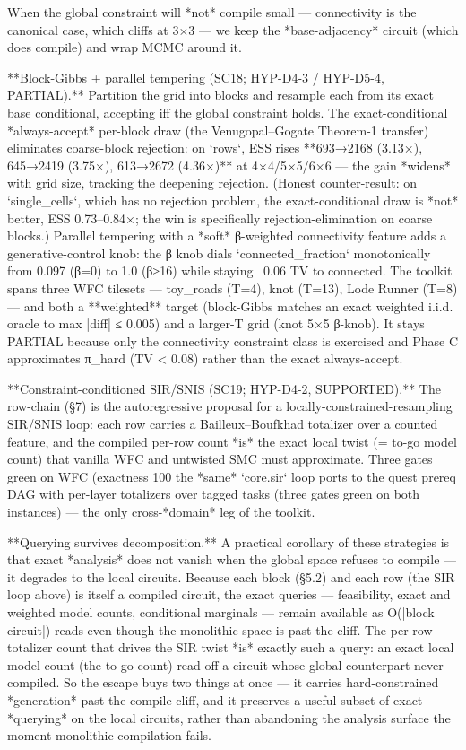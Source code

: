 \documentclass[letterpaper]{article} %
\begin{document}
When the global constraint will *not* compile small — connectivity is the canonical case, which
cliffs at 3×3 — we keep the *base-adjacency* circuit (which does compile) and wrap MCMC around it.

**Block-Gibbs + parallel tempering (SC18; HYP-D4-3 / HYP-D5-4, PARTIAL).** Partition the grid into
blocks and resample each from its exact base conditional, accepting iff the global constraint holds.
The exact-conditional *always-accept* per-block draw (the Venugopal–Gogate Theorem-1 transfer)
eliminates coarse-block rejection: on `rows`, ESS rises **693→2168 (3.13×), 645→2419 (3.75×),
613→2672 (4.36×)** at 4×4/5×5/6×6 — the gain *widens* with grid size, tracking the deepening
rejection. (Honest counter-result: on `single_cells`, which has no rejection problem, the
exact-conditional draw is *not* better, ESS 0.73–0.84×; the win is specifically rejection-elimination
on coarse blocks.) Parallel tempering with a *soft* β-weighted connectivity feature adds a
generative-control knob: the β knob dials `connected_fraction` monotonically from 0.097 (β=0) to 1.0
(β≥16) while staying ~0.06 TV to connected. The toolkit spans three WFC tilesets — toy_roads (T=4),
knot (T=13), Lode Runner (T=8) — and both a **weighted** target (block-Gibbs matches an exact weighted
i.i.d. oracle to max |diff| ≤ 0.005) and a larger-T grid (knot 5×5 β-knob). It stays PARTIAL because
only the connectivity constraint class is exercised and Phase C approximates π_hard (TV < 0.08)
rather than the exact always-accept.

**Constraint-conditioned SIR/SNIS (SC19; HYP-D4-2, SUPPORTED).** The row-chain (§7) is the
autoregressive proposal for a locally-constrained-resampling SIR/SNIS loop: each row carries a
Bailleux–Boufkhad totalizer over a counted feature, and the compiled per-row count *is* the exact
local twist (= to-go model count) that vanilla WFC and untwisted SMC must approximate. Three gates
green on WFC (exactness 100%
the *same* `core.sir` loop ports to the quest prereq DAG with per-layer totalizers over tagged tasks
(three gates green on both instances) — the only cross-*domain* leg of the toolkit.

**Querying survives decomposition.** A practical corollary of these strategies is that exact
*analysis* does not vanish when the global space refuses to compile — it degrades to the local
circuits. Because each block (§5.2) and each row (the SIR loop above) is itself a compiled circuit,
the exact queries — feasibility, exact and weighted model counts, conditional marginals — remain
available as O(|block circuit|) reads even though the monolithic space is past the cliff. The per-row
totalizer count that drives the SIR twist *is* exactly such a query: an exact local model count (the
to-go count) read off a circuit whose global counterpart never compiled. So the escape buys two
things at once — it carries hard-constrained *generation* past the compile cliff, and it preserves a
useful subset of exact *querying* on the local circuits, rather than abandoning the analysis surface
the moment monolithic compilation fails.
\end{document}

